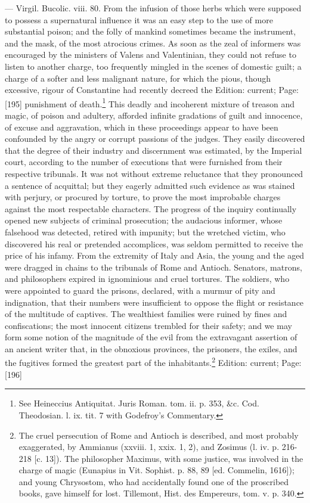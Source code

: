 {{—} Virgil. Bucolic. viii. 80.} From the infusion of those herbs which were supposed to possess a supernatural influence it was an easy step to the use of more substantial poison; and the folly of mankind sometimes became the instrument, and the mask, of the most atrocious crimes. As soon as the zeal of informers was encouraged by the ministers of Valens and Valentinian, they could not refuse to listen to another charge, too frequently mingled in the scenes of domestic guilt; a charge of a softer and less malignant nature, for which the pious, though excessive, rigour of Constantine had recently decreed the Edition: current; Page: [195] punishment of death.\footnote{See Heineccius Antiquitat. Juris Roman. tom. ii. p. 353, \&c. Cod. Theodosian. l. ix. tit. 7 with Godefroy\texthebrew{}’s Commentary.} This deadly and incoherent mixture of treason and magic, of poison and adultery, afforded infinite gradations of guilt and innocence, of excuse and aggravation, which in these proceedings appear to have been confounded by the angry or corrupt passions of the judges. They easily discovered that the degree of their industry and discernment was estimated, by the Imperial court, according to the number of executions that were furnished from their respective tribunals. It was not without extreme reluctance that they pronounced a sentence of acquittal; but they eagerly admitted such evidence as was stained with perjury, or procured by torture, to prove the most improbable charges against the most respectable characters. The progress of the inquiry continually opened new subjects of criminal prosecution; the audacious informer, whose falsehood was detected, retired with impunity; but the wretched victim, who discovered his real or pretended accomplices, was seldom permitted to receive the price of his infamy. From the extremity of Italy and Asia, the young and the aged were dragged in chains to the tribunals of Rome and Antioch. Senators, matrons, and philosophers expired in ignominious and cruel tortures. The soldiers, who were appointed to guard the prisons, declared, with a murmur of pity and indignation, that their numbers were insufficient to oppose the flight or resistance of the multitude of captives. The wealthiest families were ruined by fines and confiscations; the most innocent citizens trembled for their safety; and we may form some notion of the magnitude of the evil from the extravagant assertion of an ancient writer that, in the obnoxious provinces, the prisoners, the exiles, and the fugitives formed the greatest part of the inhabitants.\footnote{The cruel persecution of Rome and Antioch is described, and most probably exaggerated, by Ammianus (xxviii. 1, xxix. 1, 2), and Zosimus (l. iv. p. 216-218 [c. 13]). The philosopher Maximus, with some justice, was involved in the charge of magic (Eunapius in Vit. Sophist. p. 88, 89 [ed. Commelin, 1616]); and young Chrysostom, who had accidentally found one of the proscribed books, gave himself for lost. Tillemont, Hist. des Empereurs, tom. v. p. 340.}
Edition: current; Page: [196]

